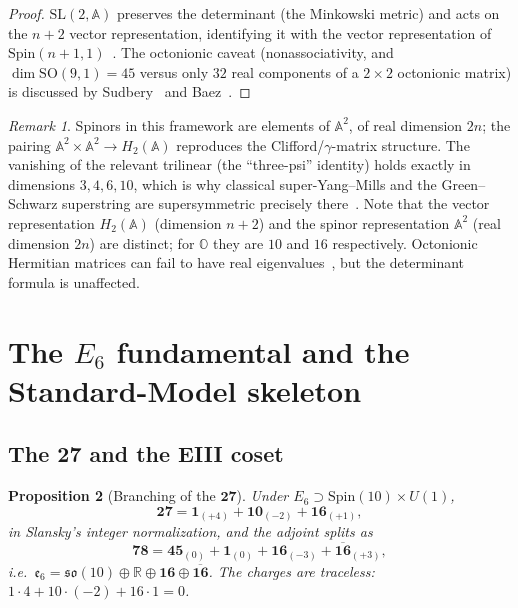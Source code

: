 \documentclass[aps,prresearch,onecolumn,amsmath,amssymb,nofootinbib]{revtex4-2}
\theoremstyle{plain}\newtheorem{theorem}{Theorem}[section]\newtheorem{proposition}[theorem]{Proposition}\newtheorem{lemma}[theorem]{Lemma}\newtheorem{corollary}[theorem]{Corollary}
\theoremstyle{definition}\newtheorem{definition}[theorem]{Definition}\newtheorem{conjecture}[theorem]{Conjecture}
\theoremstyle{remark}\newtheorem{remark}[theorem]{Remark}
\begin{document}
\begin{proof}
$\mathrm{SL}(2,\mathbb{A})$ preserves the determinant (the Minkowski metric) and acts on the $n+2$ vector representation, identifying it with the vector representation of $\mathrm{Spin}(n+1,1)$~\cite[p.~7]{BaezHuertaSUSY}. The octonionic caveat (nonassociativity, and $\dim\mathrm{SO}(9,1)=45$ versus only $32$ real components of a $2\times2$ octonionic matrix) is discussed by Sudbery~\cite{Sudbery1984} and Baez~\cite{Baez2002}.
\end{proof}

\begin{remark}
Spinors in this framework are elements of $\mathbb{A}^2$, of real dimension $2n$; the pairing $\mathbb{A}^2\times\mathbb{A}^2\to H_2(\mathbb{A})$ reproduces the Clifford/$\gamma$-matrix structure. The vanishing of the relevant trilinear (the ``three-psi'' identity) holds exactly in dimensions $3,4,6,10$, which is why classical super-Yang--Mills and the Green--Schwarz superstring are supersymmetric precisely there~\cite{KugoTownsend1983,Evans1988,BaezHuertaSUSY}. Note that the vector representation $H_2(\mathbb{A})$ (dimension $n+2$) and the spinor representation $\mathbb{A}^2$ (real dimension $2n$) are distinct; for $\mathbb{O}$ they are $10$ and $16$ respectively. Octonionic Hermitian matrices can fail to have real eigenvalues~\cite{DrayJaneskyManogue2000}, but the determinant formula is unaffected.
\end{remark}

\section{The $E_6$ fundamental and the Standard-Model skeleton}
\label{sec:F3}

\subsection{The $\mathbf{27}$ and the EIII coset}

\begin{proposition}[Branching of the $\mathbf{27}$]
\label{prop:27}
Under $E_6\supset\mathrm{Spin}(10)\times U(1)$,
\begin{equation}
\mathbf{27}=\mathbf{1}_{(+4)}+\mathbf{10}_{(-2)}+\mathbf{16}_{(+1)},
\end{equation}
in Slansky's integer normalization, and the adjoint splits as
\begin{equation}
\mathbf{78}=\mathbf{45}_{(0)}+\mathbf{1}_{(0)}+\mathbf{16}_{(-3)}+\overline{\mathbf{16}}_{(+3)},
\end{equation}
i.e.\ $\mathfrak{e}_6=\mathfrak{so}(10)\oplus\mathbb{R}\oplus\mathbf{16}\oplus\overline{\mathbf{16}}$. The charges are traceless: $1\cdot4+10\cdot(-2)+16\cdot1=0$.
\end{proposition}
\end{document}

